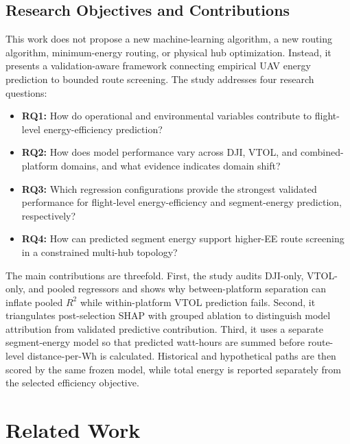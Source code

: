 \documentclass[conference,a4paper]{IEEEtran}
\begin{document}
\subsection{Research Objectives and Contributions}
This work does not propose a new machine-learning algorithm, a new routing
algorithm, minimum-energy routing, or physical hub optimization. Instead, it
presents a validation-aware framework connecting empirical UAV energy
prediction to bounded route screening. The study addresses four research
questions:
\begin{itemize}
    \item \textbf{RQ1:} How do operational and environmental variables contribute to flight-level energy-efficiency prediction?
    \item \textbf{RQ2:} How does model performance vary across DJI, VTOL, and combined-platform domains, and what evidence indicates domain shift?
    \item \textbf{RQ3:} Which regression configurations provide the strongest validated performance for flight-level energy-efficiency and segment-energy prediction, respectively?
    \item \textbf{RQ4:} How can predicted segment energy support higher-EE route screening in a constrained multi-hub topology?
\end{itemize}

The main contributions are threefold. First, the study audits DJI-only, VTOL-only, and pooled regressors and shows why between-platform separation can inflate pooled $R^2$ while within-platform VTOL prediction fails. Second, it triangulates post-selection SHAP with grouped ablation to distinguish model attribution from validated predictive contribution. Third, it uses a separate segment-energy model so that predicted watt-hours are summed before route-level distance-per-Wh is calculated. Historical and hypothetical paths are then scored by the same frozen model, while total energy is reported separately from the selected efficiency objective.

\section{Related Work}
\end{document}
